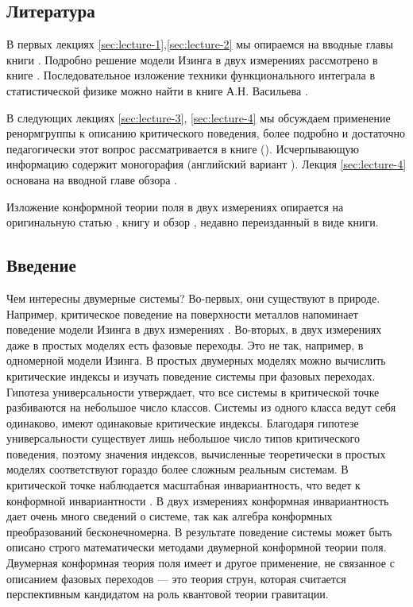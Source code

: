 \documentclass[a4paper,12pt]{article}
\theoremstyle{definition}
\theoremstyle{definition}
\theoremstyle{definition}
\begin{document}
\subsection{Литература}
\label{sec:literature}
В первых лекциях \ref{sec:lecture-1},\ref{sec:lecture-2} мы опираемся на вводные главы книги \cite{difrancesco1997cft}. Подробно решение  модели Изинга в двух измерениях рассмотрено в книге  \cite{belavin2001lect}. Последовательное изложение техники функционального интеграла в статистической физике можно найти в книге А.Н. Васильева \cite{vasiliev1976}.

В следующих лекциях \ref{sec:lecture-3}, \ref{sec:lecture-4} мы обсуждаем применение ренормгруппы к описанию критического поведения, более подробно и достаточно педагогически этот вопрос рассматривается в книге \cite{ma1980} (\cite{ma2000modern}). Исчерпывающую информацию содержит моногорафия \cite{vasiliev1998} (английский вариант \cite{Vasilev:1027193}).
Лекция \ref{sec:lecture-4} основана на вводной главе обзора \cite{Ravanini:2000st}.

Изложение конформной теории поля в двух измерениях опирается на оригинальную статью \cite{belavin1984ics}, книгу \cite{difrancesco1997cft} и обзор \cite{zamolodchikov1989rus,zamolodchikov1989conformal}, недавно переизданный в виде книги.

\subsection{Введение}
\label{sec:intro}
Чем интересны двумерные системы? Во-первых, они существуют в природе. Например, критическое поведение на поверхности металлов напоминает поведение модели Изинга в двух измерениях \cite{campuzano1985110}. Во-вторых, в двух измерениях даже в простых моделях есть фазовые переходы. Это не так, например,  в одномерной модели Изинга. В простых двумерных моделях можно вычислить критические индексы и изучать поведение системы при фазовых переходах. Гипотеза универсальности утверждает, что все системы в критической точке разбиваются на небольшое число классов. Системы из одного класса ведут себя одинаково, имеют одинаковые критические индексы. Благодаря гипотезе универсальности существует лишь небольшое число типов критического поведения, поэтому значения индексов, вычисленные теоретически в простых моделях соответствуют гораздо более сложным реальным системам.
В критической точке наблюдается масштабная инвариантность, что ведет к конформной инвариантности \cite{Polyakov:1970xd}. В двух измерениях конформная инвариантность дает очень много сведений о системе, так как алгебра конформных преобразований бесконечномерна. В результате поведение системы может быть описано строго математически методами двумерной конформной теории поля. Двумерная конформная теория поля имеет и другое применение, не связанное с описанием фазовых переходов --- это теория струн, которая считается перспективным кандидатом на роль квантовой теории гравитации.
\end{document}
